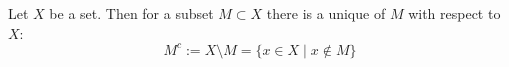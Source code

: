 \begin{Definition}
\end{Definition}

\begin{Definition}
  Let $X$ be a set. Then for a
  subset $M \subset X$ there is a unique 
  of $M$ with respect to $X$:
  	$$
  	M^c := X \setminus M = \{ x \in X \mid x \notin M \}
  	$$
\end{Definition}

